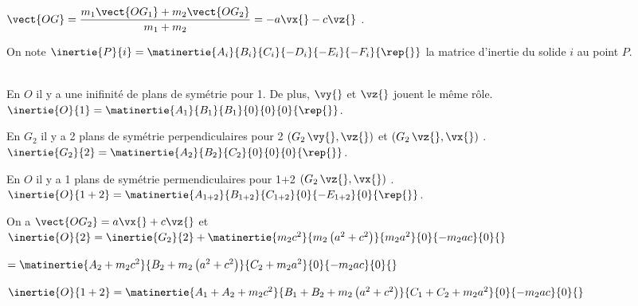 \ifprof
\begin{corrige}
$\vect{OG} = \dfrac{m_1 \vect{OG_1} + m_2 \vect{OG_2} }{m_1+m_2} =-a\vx{}-c\vz{}$ .
\end{corrige}
\else
\fi


On note $\inertie{P}{i} = \matinertie{A_i}{B_i}{C_i}{-D_i}{-E_i}{-F_i}{\rep{}}$  la matrice d'inertie du solide $i$ au point $P$.

\ifprof
\begin{corrige}~\\

En $O$ il y a une inifinité de plans de symétrie pour 1. De plus, $\vy{}$ et $\vz{}$ jouent le même rôle. 
$\inertie{O}{1} = \matinertie{A_1}{B_1}{B_1}{0}{0}{0}{\rep{}}$.

En $G_2$ il y a 2 plans de symétrie perpendiculaires pour 2 $(G_2\,\vy{},\vz{})$ et $(G_2\,\vz{},\vx{})$ .
$\inertie{G_2}{2} = \matinertie{A_2}{B_2}{C_2}{0}{0}{0}{\rep{}}$.


En $O$ il y a 1 plans de symétrie permendiculaires pour 1+2  $(G_2\,\vz{},\vx{})$ .
$\inertie{O}{1+2} = \matinertie{A_{1+2}}{B_{1+2}}{C_{1+2}}{0}{-E_{1+2}}{0}{\rep{}}$.

\end{corrige}
\else
\fi


\ifprof
\begin{corrige}

On a  $\vect{OG_2} = a\vx{}+c\vz{}$ et 
$\inertie{O}{2} = \inertie{G_2}{2} + \matinertie{m_2c^2}{m_2 \left(a^2+c^2\right)}{m_2a^2}{0}{-m_2 ac }{0}{}$

$=\matinertie{A_2+m_2c^2}{B_2 + m_2 \left(a^2+c^2\right)}{C_2 + m_2a^2}{0}{-m_2 ac }{0}{}$



$\inertie{O}{1+2} =\matinertie{A_1 + A_2+m_2c^2}{B_1 + B_2 + m_2 \left(a^2+c^2\right)}{C_1 + C_2 + m_2a^2}{0}{-m_2 ac }{0}{}$
\end{corrige}
\else
\fi


